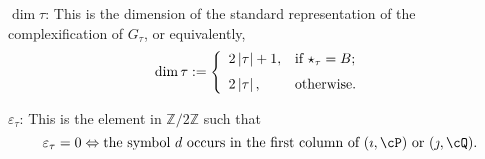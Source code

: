 \documentclass[12pt,a4paper]{amsart}
\def\abs#1{\left|{#1}\right|}
\newcommand{\Z}{\mathbb{Z}}
\numberwithin{equation}{section}
\theoremstyle{remark}
\begin{document}
\smallskip


 \smallskip

  \noindent $\dim \tau$:
This is the dimension of the standard representation of the complexification of $G_\tau$, or equivalently,
 \[
 \dim \tau:= \left\{
     \begin{array}{ll}
          2\abs{ \tau}+1, &\hbox{if $\star_\tau=B$}; \medskip\\
         2 \abs{\tau}, &\hbox{otherwise}.
            \end{array}
   \right.
 \]

\smallskip


 \smallskip

  \noindent $\varepsilon_\tau$:
This is the element in $\Z/2\Z$ such that
\[
  \varepsilon_\tau=0\Leftrightarrow  \textrm{the symbol $d$ occurs in the first column of $( \imath, \cP)$ or $(\jmath, \cQ)$}.
\]

 \smallskip
\end{document}
